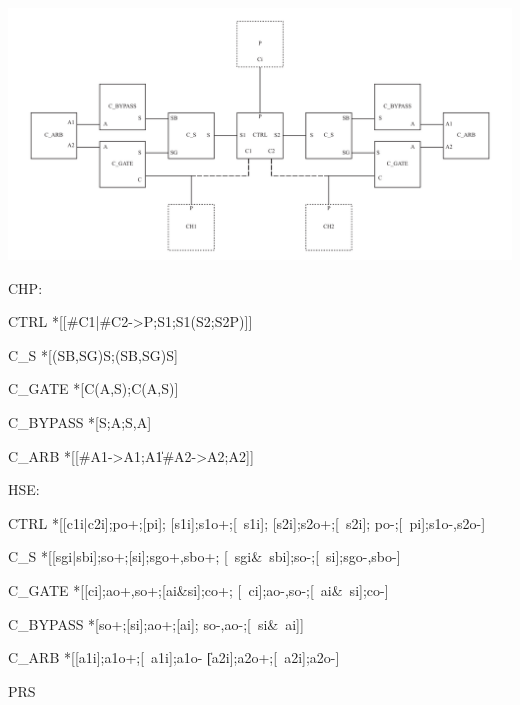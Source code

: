 \documentclass{article}
\begin{document}
\includegraphics[width=\textwidth]{img/transmitter/arb.pdf}

\noindent CHP:

\begin{csp}
CTRL\equiv
  *[[#{C1}|#{C2}->P;S1;S1\star(S2;S2\star\!P)]]
\end{csp}
\begin{csp}
C_S\equiv
  *[(SB,SG)\star\!S;(SB,SG)\star\!S]
\end{csp}
\begin{csp}  
C_GATE\equiv
  *[C\star(A,S);C\star(A,S)]
\end{csp}
\begin{csp}
C_BYPASS\equiv
  *[S;A;S,A]
\end{csp}
\begin{csp}
C_ARB\equiv
  *[[#{A1}->A1;A1\|#{A2}->A2;A2]]
\end{csp}

\noindent HSE:

\begin{hse}
CTRL\equiv
  *[[c1i|c2i];po+;[pi];
    [s1i];s1o+;[~s1i];
    [s2i];s2o+;[~s2i];
    po-;[~pi];s1o-,s2o-]
\end{hse}
\begin{hse}
C_S\equiv
  *[[sgi|sbi];so+;[si];sgo+,sbo+;
    [~sgi&~sbi];so-;[~si];sgo-,sbo-]
\end{hse}
\begin{hse}
C_GATE\equiv    
  *[[ci];ao+,so+;[ai&si];co+;
    [~ci];ao-,so-;[~ai&~si];co-]
\end{hse}
\begin{hse}
C_BYPASS\equiv
  *[so+;[si];ao+;[ai];
    so-,ao-;[~si&~ai]]
\end{hse}
\begin{hse}
C_ARB\equiv
  *[[a1i];a1o+;[~a1i];a1o-
   \|[a2i];a2o+;[~a2i];a2o-]
\end{hse}

\noindent PRS
\end{document}
